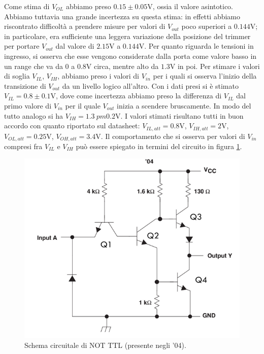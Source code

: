 \documentclass[10pt,a4paper]{article}
\begin{document}
Come stima di $V_{OL}$ abbiamo preso $0.15 \pm 0.05$V, ossia il valore asintotico. Abbiamo tuttavia una grande incertezza su questa stima: in effetti abbiamo riscontrato difficoltà a prendere misure per valori di $V_{out}$ poco superiori a $0.144$V; in particolare, era sufficiente una leggera variazione della posizione del trimmer per portare $V_{out}$ dal valore di $2.15$V a $0.144$V.
Per quanto riguarda le tensioni in ingresso, si osserva che esse vengono considerate dalla porta come valore basso in un range che va da $0$ a $0.8$V circa, mentre alto da $1.3$V in poi.
Per stimare i valori di soglia $V_{IL}$, $V_{IH}$, abbiamo preso i valori di $V_{in}$ per i quali si osserva l'inizio della transizione di $V_{out}$ da un livello logico all'altro. Con i dati presi si è stimato $V_{IL} = 0.8\pm 0.1$V, dove come incertezza abbiamo preso la differenza di $V_{IL}$ dal primo valore di $V_{in}$ per il quale $V_{out}$ inizia a scendere bruscamente.
In modo del tutto analogo si ha $V_{IH} = 1.3\ pm 0.2$V. 
I valori stimati risultano tutti in buon accordo con quanto riportato sul datasheet:
$V_{IL,att}= 0.8$V, $V_{IH, att}=2$V, $V_{OL, att}=0.25$V, $V_{OH, att}=3.4$V.
Il comportamento che si osserva per valori di $V_{in}$ compresi fra $V_{IL}$ e $V_{IH}$ può essere spiegato in termini del circuito in figura \ref{fig:ttl}.

\begin{figure}
\centering
\includegraphics[scale=0.6]{ttl.png}
\caption{Schema circuitale di NOT TTL (presente negli '04).\label{fig:ttl}}
\end{figure}
\end{document}

